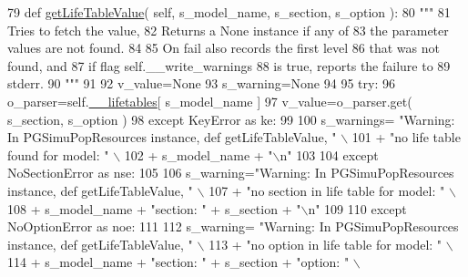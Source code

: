 \begin{DoxyCode}
79     \textcolor{keyword}{def }\hyperlink{classpgsimupopresources_1_1PGSimuPopResources_ace3ec1ee66c54bfb806a7dfa80755105}{getLifeTableValue}( self, s\_model\_name, s\_section, s\_option ):
80         \textcolor{stringliteral}{"""}
81 \textcolor{stringliteral}{        Tries to fetch the value, }
82 \textcolor{stringliteral}{        Returns a None instance if any of }
83 \textcolor{stringliteral}{        the parameter values are not found.}
84 \textcolor{stringliteral}{}
85 \textcolor{stringliteral}{        On fail also records the first level}
86 \textcolor{stringliteral}{        that was not found, and}
87 \textcolor{stringliteral}{        if flag self.\_\_write\_warnings}
88 \textcolor{stringliteral}{        is true, reports the failure to}
89 \textcolor{stringliteral}{        stderr.}
90 \textcolor{stringliteral}{        """}
91 
92         v\_value=\textcolor{keywordtype}{None}
93         s\_warning=\textcolor{keywordtype}{None}
94 
95         \textcolor{keywordflow}{try}:
96             o\_parser=self.\hyperlink{classpgsimupopresources_1_1PGSimuPopResources_ad9daf54de0324dec1e84763924226f49}{\_\_lifetables}[ s\_model\_name ]
97             v\_value=o\_parser.get( s\_section, s\_option )
98         \textcolor{keywordflow}{except} KeyError \textcolor{keyword}{as} ke:
99 
100             s\_warnings= \textcolor{stringliteral}{"Warning: In PGSimuPopResources instance, def getLifeTableValue, "} \(\backslash\)
101                     + \textcolor{stringliteral}{"no life table found for model: "}  \(\backslash\)
102                     + s\_model\_name + \textcolor{stringliteral}{"\(\backslash\)n"} 
103 
104         \textcolor{keywordflow}{except} NoSectionError \textcolor{keyword}{as} nse:
105 
106             s\_warning=\textcolor{stringliteral}{"Warning: In PGSimuPopResources instance, def getLifeTableValue, "} \(\backslash\)
107                     + \textcolor{stringliteral}{"no section in life table for model: "}  \(\backslash\)
108                     + s\_model\_name + \textcolor{stringliteral}{"section: "} + s\_section + \textcolor{stringliteral}{"\(\backslash\)n"} 
109 
110         \textcolor{keywordflow}{except} NoOptionError \textcolor{keyword}{as} noe:
111 
112             s\_warning= \textcolor{stringliteral}{"Warning: In PGSimuPopResources instance, def getLifeTableValue, "} \(\backslash\)
113                     + \textcolor{stringliteral}{"no option in life table for model: "}  \(\backslash\)
114                     + s\_model\_name + \textcolor{stringliteral}{"section: "} + s\_section + \textcolor{stringliteral}{"option: "} \(\backslash\)

\end{DoxyCode}

